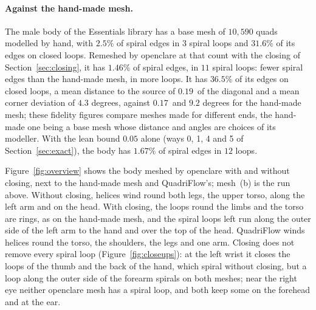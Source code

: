 \documentclass[11pt,a4paper]{article}
\begin{document}
\paragraph{Against the hand-made mesh.}
The male body of the Essentials library has a base mesh of $10{,}590$ quads
modelled by hand, with $2.5\%$ of spiral edges in $3$ spiral loops and
$31.6\%$ of its edges on closed loops. Remeshed by openclare at that count
with the closing of Section~\ref{sec:closing}, it has $1.46\%$ of spiral
edges, in $11$ spiral loops: fewer spiral edges than the hand-made mesh, in
more loops. It has $36.5\%$ of its edges on closed loops, a mean distance to
the source of $0.19$\textperthousand\ of the diagonal and a mean corner
deviation of $4.3$ degrees, against $0.17$\textperthousand\ and $9.2$ degrees
for the hand-made mesh; these fidelity figures compare meshes made for
different ends, the hand-made one being a base mesh whose distance and
angles are choices of its modeller. With the lean bound $0.05$ alone (ways
0, 1, 4 and 5 of Section~\ref{sec:exact}), the body has $1.67\%$ of spiral
edges in $12$ loops.

Figure~\ref{fig:overview} shows the body meshed by openclare with and
without closing, next to the hand-made mesh and QuadriFlow's; mesh~(b) is
the run above. Without closing, helices wind round both legs, the upper
torso, along the left arm and on the head. With closing, the loops round the
limbs and the torso are rings, as on the hand-made mesh, and the spiral
loops left run along the outer side of the left arm to the hand and over the
top of the head. QuadriFlow winds helices round the torso, the shoulders,
the legs and one arm. Closing does not remove every spiral loop
(Figure~\ref{fig:closeups}): at the left wrist it closes the loops of the
thumb and the back of the hand, which spiral without closing, but a loop
along the outer side of the forearm spirals on both meshes; near the right
eye neither openclare mesh has a spiral loop, and both keep some on the
forehead and at the ear.
\end{document}
